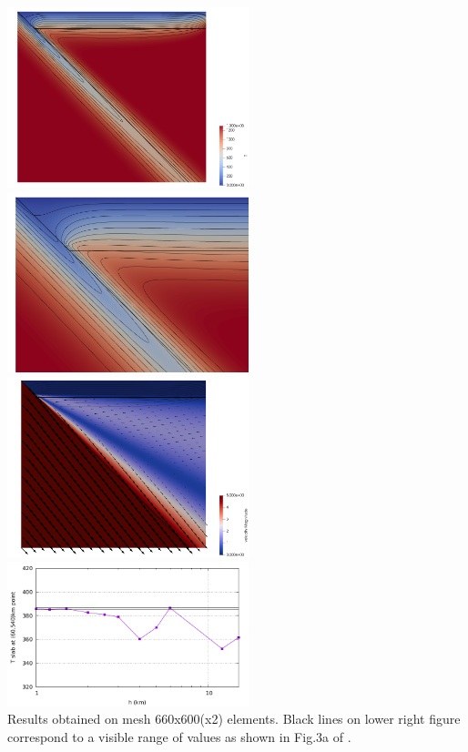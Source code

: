 \begin{center}
\includegraphics[width=7cm]{python_codes/fieldstone_45/images/temp}
\includegraphics[width=7cm]{python_codes/fieldstone_45/images/temp_zoom}\\
\includegraphics[width=7cm]{python_codes/fieldstone_45/images/vel}
\includegraphics[width=7cm]{python_codes/fieldstone_45/images/T60.pdf}\\
{\small Results obtained on mesh 660x600(x2) elements. Black lines on lower right figure 
correspond to a visible range of values as shown in Fig.3a of \cite{vack08}.}
\end{center}

